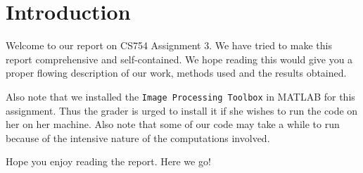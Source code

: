 \documentclass[a4paper,11pt]{article}
\numberwithin{definition}{section}
\numberwithin{mytheorem}{subsection}
\begin{document}

\date{Spring 2022}
\maketitle

\justifying
\tableofcontents

\newpage
\justifying
\section*{Introduction}

Welcome  to our report on CS754 Assignment 3. We have tried to make this report comprehensive and self-contained. We hope reading this would give you a proper flowing description of our work, methods used and the results obtained.

Also note that we installed the \texttt{Image Processing Toolbox} in MATLAB for this assignment. Thus the grader is urged to install it if she wishes to run the code on her on her machine. Also note that some of our code may take a while to run because of the intensive nature of the computations involved.

Hope you enjoy reading the report. Here we go!
\end{document}
